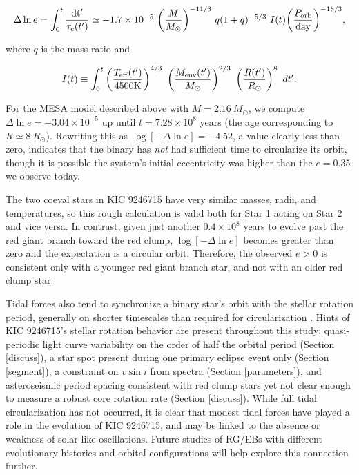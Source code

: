 \begin{equation}\label{tide1}
\Delta \ln e = \int_0^t \frac{\rm{d}t'}{\tau_c(t')} \simeq -1.7 \times 10^{-5} \ {\left( \frac{M}{M_{\odot}} \right)}^{-11/3} \ q(1+q)^{-5/3} \ I(t) {\left( \frac{P_{\rm{orb}}}{\rm{day}} \right)}^{-16/3},
\end{equation}

where $q$ is the mass ratio and

\begin{equation}
I(t) \equiv \int_0^t \left( \frac{T_{\rm{eff}}(t')}{4500 \rm{K}} \right)^{4/3} \ \left( \frac{M_{\rm{env}}(t')}{M_{\odot}} \right)^{2/3} \ \left( \frac{R(t')}{R_{\odot}} \right)^8 \ dt'.
\end{equation}

For the MESA model described above with $M = 2.16 \ M_{\odot}$, we compute $\Delta \ln e = -3.04 \times 10^{-5}$ up until $t = 7.28 \times 10^8$ years (the age corresponding to $R \simeq 8 \ R_{\odot}$). Rewriting this as $\log [-\Delta \ln e] = -4.52$, a value clearly less than zero, indicates that the binary has \emph{not} had sufficient time to circularize its orbit, though it is possible the system's initial eccentricity was higher than the $e = 0.35$ we observe today.

The two coeval stars in KIC 9246715 have very similar masses, radii, and temperatures, so this rough calculation is valid both for Star 1 acting on Star 2 and vice versa. In contrast, given just another $0.4 \times 10^8$ years to evolve past the red giant branch toward the red clump, $\log [-\Delta \ln e]$ becomes greater than zero and the expectation is a circular orbit. Therefore, the observed $e > 0$ is consistent only with a younger red giant branch star, and not with an older red clump star.

Tidal forces also tend to synchronize a binary star's orbit with the stellar rotation period, generally on shorter timescales than required for circularization \citep{ogi14}. Hints of KIC 9246715's stellar rotation behavior are present throughout this study: quasi-periodic light curve variability on the order of half the orbital period (Section \ref{discuss}), a star spot present during one primary eclipse event only (Section \ref{segment}), a constraint on $v \sin i$ from spectra (Section \ref{parameters}), and asteroseismic period spacing consistent with red clump stars yet not clear enough to measure a robust core rotation rate (Section \ref{discuss}). While full tidal circularization has not occurred, it is clear that modest tidal forces have played a role in the evolution of KIC 9246715, and may be linked to the absence or weakness of solar-like oscillations. Future studies of RG/EBs with different evolutionary histories and orbital configurations will help explore this connection further.
  
  
  
  
  
  
  
  
  
  
  
  
  